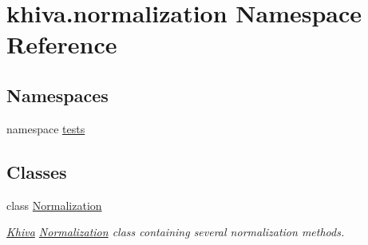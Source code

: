\hypertarget{namespacekhiva_1_1normalization}{}\section{khiva.\+normalization Namespace Reference}
\label{namespacekhiva_1_1normalization}
\subsection*{Namespaces}
\begin{DoxyCompactItemize}
\item 
namespace \mbox{\hyperlink{namespacekhiva_1_1normalization_1_1tests}{tests}}
\end{DoxyCompactItemize}
\subsection*{Classes}
\begin{DoxyCompactItemize}
\item 
class \mbox{\hyperlink{classkhiva_1_1normalization_1_1_normalization}{Normalization}}
\begin{DoxyCompactList}\small\item\em \mbox{\hyperlink{classkhiva_1_1_khiva}{Khiva}} \mbox{\hyperlink{classkhiva_1_1normalization_1_1_normalization}{Normalization}} class containing several normalization methods. \end{DoxyCompactList}\end{DoxyCompactItemize}

